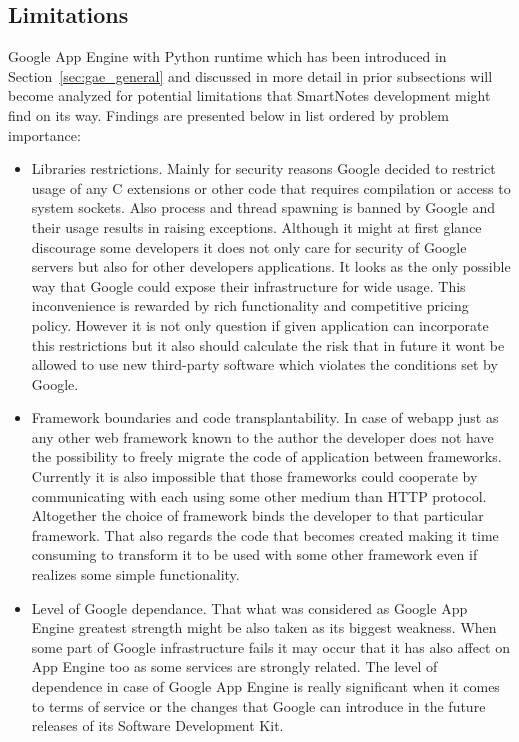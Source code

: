 \subsection{Limitations}\label{subsec:limitations}
Google App Engine with Python runtime which has been introduced in Section~\ref{sec:gae_general} and discussed in more detail in prior subsections will become analyzed for potential limitations that SmartNotes development might find on its way. Findings are presented below in list ordered by problem importance:
\begin{itemize}
\item{Libraries restrictions. Mainly for security reasons Google decided to restrict usage of any C extensions or other code that requires compilation or access to system sockets. Also process and thread spawning is banned by Google and their usage results in raising exceptions. Although it might at first glance discourage some developers it does not only care for security of Google servers but also for other developers applications. It looks as the only possible way that Google could expose their infrastructure for wide usage. This inconvenience is rewarded by rich functionality and competitive pricing policy. However it is not only question if given application can incorporate this restrictions but it also should calculate the risk that in future it wont be allowed to use new third-party software which violates the conditions set by Google.}

\item{Framework boundaries and code transplantability. In case of webapp just as any other web framework known to the author the developer does not have the possibility to freely migrate the code of application between frameworks. Currently it is also impossible that those frameworks could cooperate by communicating with each using some other medium than HTTP protocol. Altogether the choice of framework binds the developer to that particular framework. That also regards the code that becomes created making it time consuming to transform it to be used with some other framework even if realizes some simple functionality.}

\item{Level of Google dependance. That what was considered as Google App Engine greatest strength might be also taken as its biggest weakness. When some part of Google infrastructure fails it may occur that it has also affect on App Engine too as some services are strongly related. The level of dependence in case of Google App Engine is really significant when it comes to terms of service or the changes that Google can introduce in the future releases of its Software Development Kit.}


\end{itemize}
